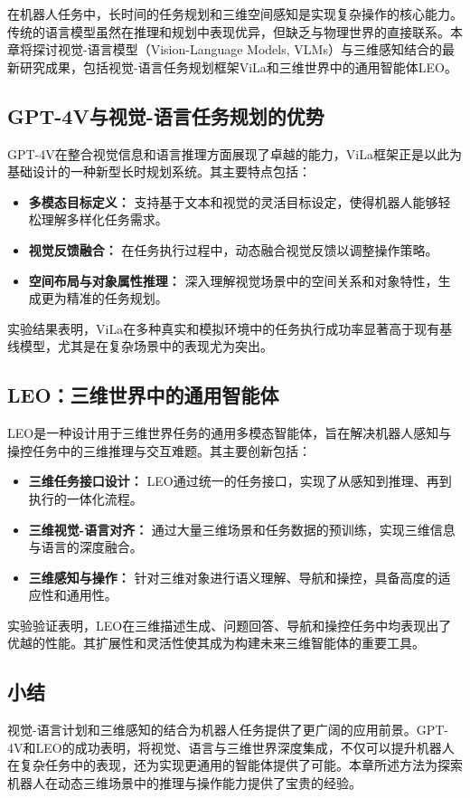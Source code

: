 \documentclass[a4paper]{article}
\begin{document}
在机器人任务中，长时间的任务规划和三维空间感知是实现复杂操作的核心能力。传统的语言模型虽然在推理和规划中表现优异，但缺乏与物理世界的直接联系。本章将探讨视觉-语言模型（Vision-Language Models, VLMs）与三维感知结合的最新研究成果，包括视觉-语言任务规划框架ViLa和三维世界中的通用智能体LEO。

\subsection{GPT-4V与视觉-语言任务规划的优势}
GPT-4V在整合视觉信息和语言推理方面展现了卓越的能力，ViLa框架正是以此为基础设计的一种新型长时规划系统。其主要特点包括：
\begin{itemize}
    \item \textbf{多模态目标定义：} 支持基于文本和视觉的灵活目标设定，使得机器人能够轻松理解多样化任务需求。
    \item \textbf{视觉反馈融合：} 在任务执行过程中，动态融合视觉反馈以调整操作策略。
    \item \textbf{空间布局与对象属性推理：} 深入理解视觉场景中的空间关系和对象特性，生成更为精准的任务规划。
\end{itemize}
实验结果表明，ViLa在多种真实和模拟环境中的任务执行成功率显著高于现有基线模型，尤其是在复杂场景中的表现尤为突出。

\subsection{LEO：三维世界中的通用智能体}
LEO是一种设计用于三维世界任务的通用多模态智能体，旨在解决机器人感知与操控任务中的三维推理与交互难题。其主要创新包括：
\begin{itemize}
    \item \textbf{三维任务接口设计：} LEO通过统一的任务接口，实现了从感知到推理、再到执行的一体化流程。
    \item \textbf{三维视觉-语言对齐：} 通过大量三维场景和任务数据的预训练，实现三维信息与语言的深度融合。
    \item \textbf{三维感知与操作：} 针对三维对象进行语义理解、导航和操控，具备高度的适应性和通用性。
\end{itemize}
实验验证表明，LEO在三维描述生成、问题回答、导航和操控任务中均表现出了优越的性能。其扩展性和灵活性使其成为构建未来三维智能体的重要工具。

\subsection{小结}
视觉-语言计划和三维感知的结合为机器人任务提供了更广阔的应用前景。GPT-4V和LEO的成功表明，将视觉、语言与三维世界深度集成，不仅可以提升机器人在复杂任务中的表现，还为实现更通用的智能体提供了可能。本章所述方法为探索机器人在动态三维场景中的推理与操作能力提供了宝贵的经验。
\end{document}
